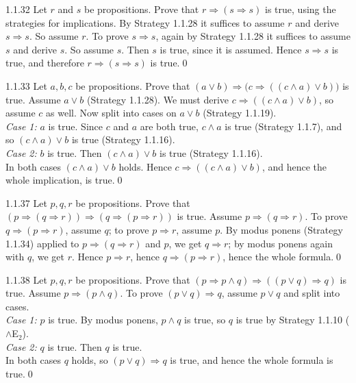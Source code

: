 \begin{bookex}[essential]{1.1.32}
Let $r$ and $s$ be propositions. Prove that $r\Rightarrow(s\Rightarrow s)$ is true, using the strategies for implications.
\solution
By Strategy 1.1.28 it suffices to assume $r$ and derive $s\Rightarrow s$. So assume $r$. To prove $s\Rightarrow s$, again by Strategy 1.1.28 it suffices to assume $s$ and derive $s$. So assume $s$. Then $s$ is true, since it is assumed. Hence $s\Rightarrow s$ is true, and therefore $r\Rightarrow(s\Rightarrow s)$ is true.\qed
\end{bookex}

\begin{bookex}[essential]{1.1.33}
Let $a,b,c$ be propositions. Prove that $(a\vee b)\Rightarrow\big(c\Rightarrow((c\wedge a)\vee b)\big)$ is true.
\solution
Assume $a\vee b$ (Strategy 1.1.28). We must derive $c\Rightarrow((c\wedge a)\vee b)$, so assume $c$ as well. Now split into cases on $a\vee b$ (Strategy 1.1.19).\\
\emph{Case 1:} $a$ is true. Since $c$ and $a$ are both true, $c\wedge a$ is true (Strategy 1.1.7), and so $(c\wedge a)\vee b$ is true (Strategy 1.1.16).\\
\emph{Case 2:} $b$ is true. Then $(c\wedge a)\vee b$ is true (Strategy 1.1.16).\\
In both cases $(c\wedge a)\vee b$ holds. Hence $c\Rightarrow((c\wedge a)\vee b)$, and hence the whole implication, is true.\qed
\end{bookex}

\begin{bookex}[recommended]{1.1.37}
Let $p,q,r$ be propositions. Prove that $(p\Rightarrow(q\Rightarrow r))\Rightarrow(q\Rightarrow(p\Rightarrow r))$ is true.
\solution
Assume $p\Rightarrow(q\Rightarrow r)$. To prove $q\Rightarrow(p\Rightarrow r)$, assume $q$; to prove $p\Rightarrow r$, assume $p$. By modus ponens (Strategy 1.1.34) applied to $p\Rightarrow(q\Rightarrow r)$ and $p$, we get $q\Rightarrow r$; by modus ponens again with $q$, we get $r$. Hence $p\Rightarrow r$, hence $q\Rightarrow(p\Rightarrow r)$, hence the whole formula.\qed
\end{bookex}

\begin{bookex}[essential]{1.1.38}
Let $p,q,r$ be propositions. Prove that $(p\Rightarrow p\wedge q)\Rightarrow((p\vee q)\Rightarrow q)$ is true.
\solution
Assume $p\Rightarrow(p\wedge q)$. To prove $(p\vee q)\Rightarrow q$, assume $p\vee q$ and split into cases.\\
\emph{Case 1:} $p$ is true. By modus ponens, $p\wedge q$ is true, so $q$ is true by Strategy 1.1.10 ($\wedge$E$_2$).\\
\emph{Case 2:} $q$ is true. Then $q$ is true.\\
In both cases $q$ holds, so $(p\vee q)\Rightarrow q$ is true, and hence the whole formula is true.\qed
\end{bookex}


